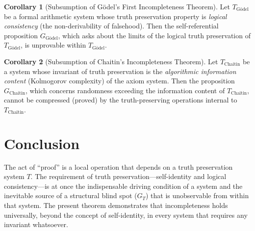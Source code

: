 \documentclass[11pt,a4paper]{article}
\theoremstyle{definition}
\newtheorem{corollary}{Corollary}[section]
\begin{document}
\begin{corollary}[Subsumption of G\"{o}del's First Incompleteness Theorem]
Let $T_{\text{G\"{o}del}}$ be a formal arithmetic system whose truth preservation property is \emph{logical consistency} (the non-derivability of falsehood). Then the self-referential proposition $G_{\text{G\"{o}del}}$, which asks about the limits of the logical truth preservation of $T_{\text{G\"{o}del}}$, is unprovable within $T_{\text{G\"{o}del}}$.
\end{corollary}

\begin{corollary}[Subsumption of Chaitin's Incompleteness Theorem]
Let $T_{\text{Chaitin}}$ be a system whose invariant of truth preservation is the \emph{algorithmic information content} (Kolmogorov complexity) of the axiom system. Then the proposition $G_{\text{Chaitin}}$, which concerns randomness exceeding the information content of $T_{\text{Chaitin}}$, cannot be compressed (proved) by the truth-preserving operations internal to $T_{\text{Chaitin}}$.
\end{corollary}

\section{Conclusion}

The act of ``proof'' is a local operation that depends on a truth preservation system $T$. The requirement of truth preservation---self-identity and logical consistency---is at once the indispensable driving condition of a system and the inevitable source of a structural blind spot ($G_T$) that is unobservable from within that system. The present theorem demonstrates that incompleteness holds universally, beyond the concept of self-identity, in every system that requires any invariant whatsoever.
\end{document}
